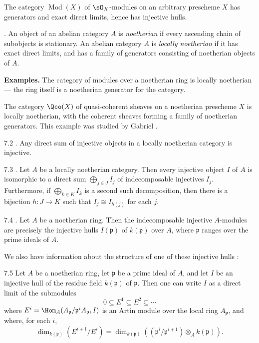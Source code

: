 The category $\operatorname{Mod}(X)$ of $\sO_X$-modules on an arbitrary prescheme $X$ has generators and exact direct limits, hence has injective hulls.

\begin{definition*}
\cite[\nopp Ch.~II, \S4]{5}. An object of an abelian category $A$ is \emph{noetherian} if every ascending chain of subobjects is stationary. An abelian category $A$ is \emph{locally noetherian} if it has exact direct limits, and has a family of generators consisting of noetherian objects of $A$.
\end{definition*}

\textbf{Examples.}
The category of modules over a noetherian ring is locally noetherian --- the ring itself is a noetherian generator for the category.

The category $\Qco(X)$ of quasi-coherent sheaves on a noetherian prescheme $X$ is locally noetherian, with the coherent sheaves forming a family of noetherian generators. This example was studied by Gabriel \cite[\nopp Ch.~VI]{5}.

\begin{bookproposition}{7.2}\label{prop:2.7.2}
\cite[\nopp Ch.~IV, Prop.~6]{5}. Any direct sum of injective objects in a locally noetherian category is injective.
\end{bookproposition}

\begin{booktheorem}{7.3}\label{thm:2.7.3}
\cite[\nopp Ch.~IV, Thm.~2]{5}. Let $A$ be a locally noetherian category. Then every injective object $I$ of $A$ is isomorphic to a direct sum $\bigoplus_{j\in J} I_j$ of indecomposable injectives $I_j$. Furthermore, if $\bigoplus_{k\in K} I_k$ is a second such decomposition, then there is a bijection $h\colon J\to K$ such that $I_j\cong I_{h(j)}$ for each $j$.
\end{booktheorem}

\begin{bookproposition}{7.4}\label{prop:2.7.4}
\cite{13}. Let $A$ be a noetherian ring. Then the indecomposable injective $A$-modules are precisely the injective hulls $I(\mathfrak{p})$ of $k(\mathfrak{p})$ over $A$, where $\mathfrak{p}$ ranges over the prime ideals of $A$.
\end{bookproposition}

We also have information about the structure of one of these injective hulls \cite{13}:

\begin{bookproposition}{7.5}\label{prop:2.7.5}
Let $A$ be a noetherian ring, let $\mathfrak{p}$ be a prime ideal of $A$, and let $I$ be an injective hull of the residue field $k(\mathfrak{p})$ of $\mathfrak{p}$. Then one can write $I$ as a direct limit of the submodules
\[
0 \subseteq E^1 \subseteq E^2 \subseteq \cdots
\]
where $E^i = \Hom_A(A_{\mathfrak{p}}/\mathfrak{p}^i A_{\mathfrak{p}}, I)$ is an Artin module over the local ring $A_{\mathfrak{p}}$, and where, for each $i$,
\[
\dim_{k(\mathfrak{p})}(E^{i+1}/E^i) = \dim_{k(\mathfrak{p})}((\mathfrak{p}^i/\mathfrak{p}^{i+1})\otimes_A k(\mathfrak{p})).
\]
\end{bookproposition}

